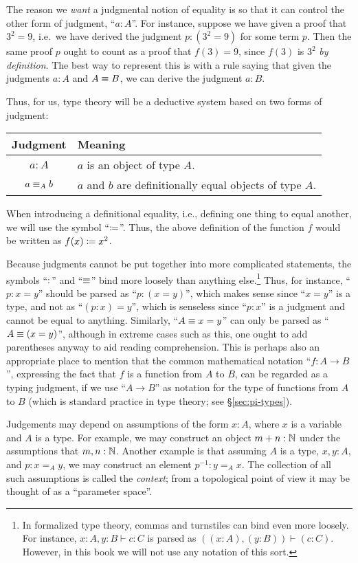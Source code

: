 The reason we \emph{want} a judgmental notion of equality is so that it can control the other form of judgment, ``$a:A$''.
For instance, suppose we have given a proof that $3^2=9$, i.e.\ we have derived the judgment $p:(3^2=9)$ for some term $p$.
Then the same proof $p$ ought to count as a proof that $f(3)=9$, since $f(3)$ is $3^2$ \emph{by definition}.
The best way to represent this is with a rule saying that given the judgments $a:A$ and $A\equiv B$, we can derive the judgment $a:B$.

Thus, for us, type theory will be a deductive system based on two forms of judgment:
\begin{center}
\begin{tabular}{c|l}
  \textbf{Judgment} & \textbf{Meaning}\\\hline
  $a : A$ & $a$ is an object of type $A$.\\
  $a \equiv_A b$ & $a$ and $b$ are definitionally equal objects of type $A$.
\end{tabular}
\end{center}
When introducing a definitional equality, i.e., defining one thing to equal another, we will use the symbol ``$\coloneqq$''.
Thus, the above definition of the function $f$ would be written as $f(x)\coloneqq x^2$.

Because judgments cannot be put together into more complicated statements, the symbols ``$:$'' and ``$\equiv$'' bind more loosely than anything else.\footnote{In formalized type theory, commas and turnstiles can bind even more loosely.
  For instance, $x:A,y:B\vdash c:C$ is parsed as $((x:A),(y:B))\vdash (c:C)$.
  However, in this book we will not use any notation of this sort.}
Thus, for instance, ``$p:x=y$'' should be parsed as ``$p:(x=y)$'', which makes sense since ``$x=y$'' is a type, and not as ``$(p:x)=y$'', which is senseless since ``$p:x$'' is a judgment and cannot be equal to anything.
Similarly, ``$A\equiv x=y$'' can only be parsed as ``$A\equiv(x=y)$'', although in extreme cases such as this, one ought to add parentheses anyway to aid reading comprehension.
This is perhaps also an appropriate place to mention that the common mathematical notation ``$f:A\to B$'', expressing the fact that $f$ is a function from $A$ to $B$, can be regarded as a typing judgment, if we use ``$A\to B$'' as notation for the type of functions from $A$ to $B$ (which is standard practice in type theory; see \S\ref{sec:pi-types}).

Judgements may depend on assumptions of the form $x:A$, where $x$ is a variable and $A$ is a type.
For example, we may construct an object $m + n : \mathbb{N}$ under the assumptions that $m,n : \mathbb{N}$.
Another example is that assuming $A$ is a type, $x,y : A$, and $p : x =_A y$, we may construct an element $p^{-1} : y =_A x$.
The collection of all such assumptions is called the \emph{context}; from a topological point of view it may be thought of as a ``parameter space''.

